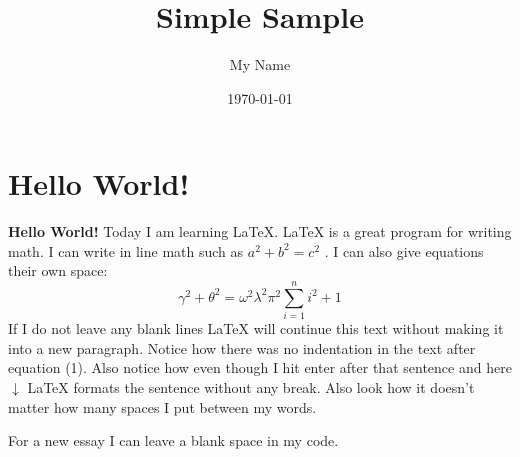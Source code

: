 \documentclass{article} %
\title{Simple Sample} %
\author{My Name} %
\date{\today} %
\begin{document}
\maketitle %

\section{Hello World!} %

\textbf{Hello World!} Today I am learning \LaTeX. %
\LaTeX{} is a great program for writing math. I can write in line math such as $a^2+b^2=c^2$ %
. I can also give equations their own space:
\begin{equation} %
  \gamma^2+\theta^2=\omega^2\lambda^2\pi^2\sum_{i=1}^n i^2+1
\end{equation}
If I do not leave any blank lines \LaTeX{} will continue  this text without making it into a new paragraph.  Notice how there was no indentation in the text after equation (1).
Also notice how even though I hit enter after that sentence and here $\downarrow$
\LaTeX{} formats the sentence without any break.  Also   look  how      it   doesn't     matter          how    many  spaces     I put     between       my    words.

For a new essay I can leave a blank space in my code.
\end{document}
